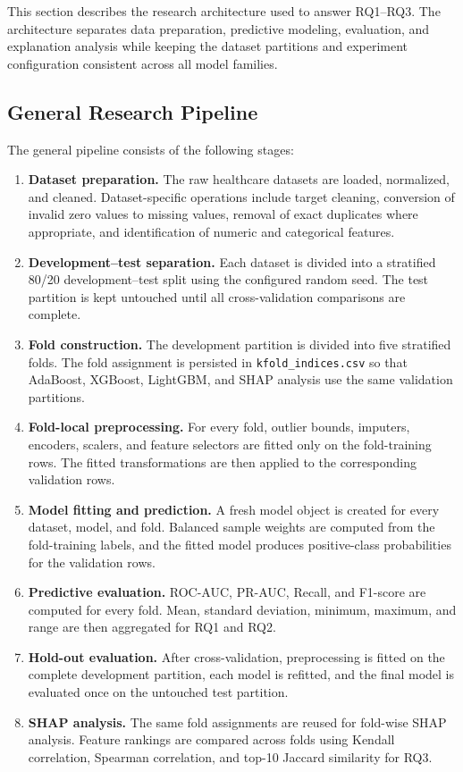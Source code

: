 This section describes the research architecture used to answer RQ1--RQ3. The architecture separates data preparation, predictive modeling, evaluation, and explanation analysis while keeping the dataset partitions and experiment configuration consistent across all model families.

\subsection{General Research Pipeline}

The general pipeline consists of the following stages:

\begin{enumerate}
    \item \textbf{Dataset preparation.} The raw healthcare datasets are loaded, normalized, and cleaned. Dataset-specific operations include target cleaning, conversion of invalid zero values to missing values, removal of exact duplicates where appropriate, and identification of numeric and categorical features.
    \item \textbf{Development--test separation.} Each dataset is divided into a stratified 80/20 development--test split using the configured random seed. The test partition is kept untouched until all cross-validation comparisons are complete.
    \item \textbf{Fold construction.} The development partition is divided into five stratified folds. The fold assignment is persisted in \texttt{kfold\_indices.csv} so that AdaBoost, XGBoost, LightGBM, and SHAP analysis use the same validation partitions.
    \item \textbf{Fold-local preprocessing.} For every fold, outlier bounds, imputers, encoders, scalers, and feature selectors are fitted only on the fold-training rows. The fitted transformations are then applied to the corresponding validation rows.
    \item \textbf{Model fitting and prediction.} A fresh model object is created for every dataset, model, and fold. Balanced sample weights are computed from the fold-training labels, and the fitted model produces positive-class probabilities for the validation rows.
    \item \textbf{Predictive evaluation.} ROC-AUC, PR-AUC, Recall, and F1-score are computed for every fold. Mean, standard deviation, minimum, maximum, and range are then aggregated for RQ1 and RQ2.
    \item \textbf{Hold-out evaluation.} After cross-validation, preprocessing is fitted on the complete development partition, each model is refitted, and the final model is evaluated once on the untouched test partition.
    \item \textbf{SHAP analysis.} The same fold assignments are reused for fold-wise SHAP analysis. Feature rankings are compared across folds using Kendall correlation, Spearman correlation, and top-10 Jaccard similarity for RQ3.
\end{enumerate}

